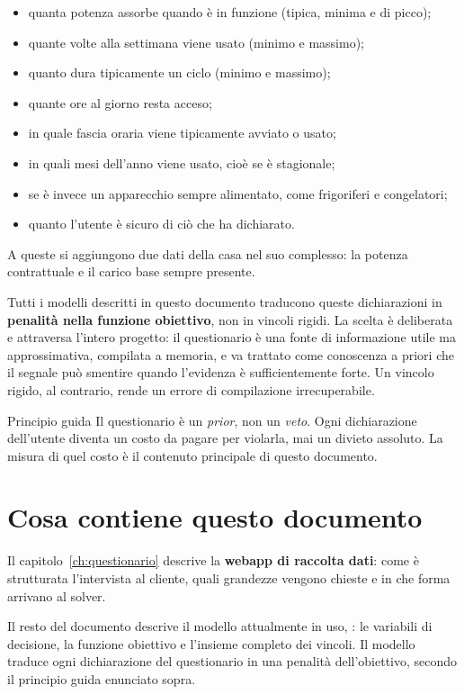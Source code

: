 \begin{itemize}[nosep,leftmargin=1.4em]
  \item quanta potenza assorbe quando è in funzione (tipica, minima e di picco);
  \item quante volte alla settimana viene usato (minimo e massimo);
  \item quanto dura tipicamente un ciclo (minimo e massimo);
  \item quante ore al giorno resta acceso;
  \item in quale fascia oraria viene tipicamente avviato o usato;
  \item in quali mesi dell'anno viene usato, cioè se è stagionale;
  \item se è invece un apparecchio sempre alimentato, come frigoriferi e congelatori;
  \item quanto l'utente è sicuro di ciò che ha dichiarato.
\end{itemize}

A queste si aggiungono due dati della casa nel suo complesso: la potenza contrattuale e il carico
base sempre presente.

Tutti i modelli descritti in questo documento traducono queste dichiarazioni in
\textbf{penalità nella funzione obiettivo}, non in vincoli rigidi. La scelta è deliberata e
attraversa l'intero progetto: il questionario è una fonte di informazione utile ma
approssimativa, compilata a memoria, e va trattato come conoscenza a priori che il segnale può
smentire quando l'evidenza è sufficientemente forte. Un vincolo rigido, al contrario, rende un
errore di compilazione irrecuperabile.

\begin{notebox}{Principio guida}
Il questionario è un \emph{prior}, non un \emph{veto}. Ogni dichiarazione dell'utente diventa un
costo da pagare per violarla, mai un divieto assoluto. La misura di quel costo è il contenuto
principale di questo documento.
\end{notebox}

\section{Cosa contiene questo documento}

Il capitolo~\ref{ch:questionario} descrive la \textbf{webapp di raccolta dati}: come è strutturata
l'intervista al cliente, quali grandezze vengono chieste e in che forma arrivano al solver.

Il resto del documento descrive il modello attualmente in uso, : le variabili di
decisione, la funzione obiettivo e l'insieme completo dei vincoli. Il modello traduce ogni
dichiarazione del questionario in una penalità dell'obiettivo, secondo il principio guida enunciato
sopra.

